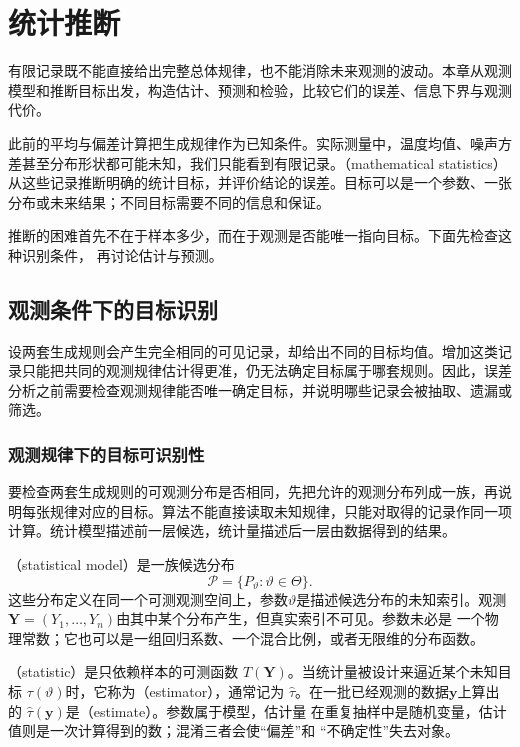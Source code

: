 \chapter{统计推断}
\label{chap:statistical-inference}
\label{chap:mathematical-statistics}

有限记录既不能直接给出完整总体规律，也不能消除未来观测的波动。本章从观测模型和推断目标出发，构造估计、预测和检验，比较它们的误差、信息下界与观测代价。

\label{sec:rv-inference}
此前的平均与偏差计算把生成规律作为已知条件。实际测量中，温度均值、噪声方差甚至分布形状都可能未知，我们只能看到有限记录。（mathematical statistics）从这些记录推断明确的统计目标，并评价结论的误差。目标可以是一个参数、一张分布或未来结果；不同目标需要不同的信息和保证。

推断的困难首先不在于样本多少，而在于观测是否能唯一指向目标。下面先检查这种识别条件，
再讨论估计与预测。

\section{观测条件下的目标识别}
\label{sec:stats-targets-data-sources}
设两套生成规则会产生完全相同的可见记录，却给出不同的目标均值。增加这类记录只能把共同的观测规律估计得更准，仍无法确定目标属于哪套规则。因此，误差分析之前需要检查观测规律能否唯一确定目标，并说明哪些记录会被抽取、遗漏或筛选。

\subsection{观测规律下的目标可识别性}
\label{sec:statistics-model-target}
要检查两套生成规则的可观测分布是否相同，先把允许的观测分布列成一族，再说明每张规律对应的目标。算法不能直接读取未知规律，只能对取得的记录作同一项计算。统计模型描述前一层候选，统计量描述后一层由数据得到的结果。
\begin{definition}[统计模型与统计量]
  \label{def:statistics-model-statistic}
（statistical model）是一族候选分布
\[
  \mathcal{P}=\{P_\vartheta:\vartheta\in\Theta\}.
\]
这些分布定义在同一个可测观测空间上，参数\(\vartheta\)是描述候选分布的未知索引。观测
\(\bm{Y}=(Y_1,\ldots,Y_n)\)由其中某个分布产生，但真实索引不可见。参数未必是
一个物理常数；它也可以是一组回归系数、一个混合比例，或者无限维的分布函数。

（statistic）是只依赖样本的可测函数
\(T(\bm{Y})\)。当统计量被设计来逼近某个未知目标
\(\tau(\vartheta)\)时，它称为（estimator），通常记为
\(\widehat{\tau}\)。在一批已经观测的数据\(\bm{y}\)上算出的
\(\widehat{\tau}(\bm{y})\)是（estimate）。参数属于模型，估计量
在重复抽样中是随机变量，估计值则是一次计算得到的数；混淆三者会使“偏差”和
“不确定性”失去对象。
\end{definition}

